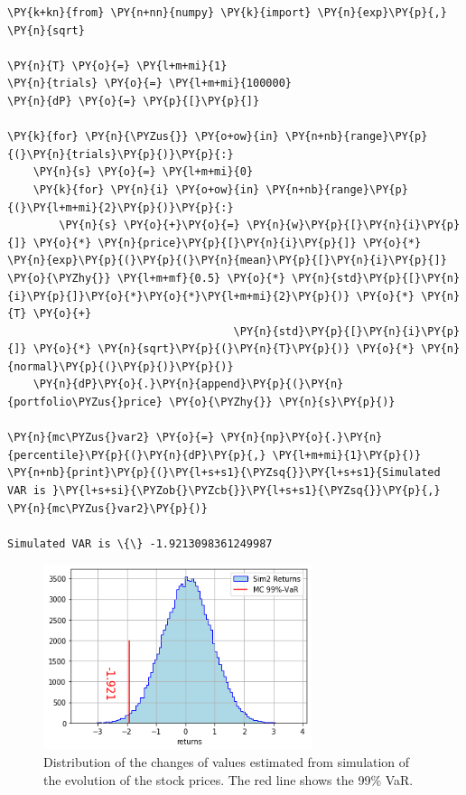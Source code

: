 \begin{tcolorbox}[breakable, size=fbox, boxrule=1pt, pad at break*=1mm,colback=cellbackground, colframe=cellborder]
\begin{Verbatim}[commandchars=\\\{\}]
\PY{k+kn}{from} \PY{n+nn}{numpy} \PY{k}{import} \PY{n}{exp}\PY{p}{,} \PY{n}{sqrt}
		
\PY{n}{T} \PY{o}{=} \PY{l+m+mi}{1}
\PY{n}{trials} \PY{o}{=} \PY{l+m+mi}{100000}
\PY{n}{dP} \PY{o}{=} \PY{p}{[}\PY{p}{]}
		
\PY{k}{for} \PY{n}{\PYZus{}} \PY{o+ow}{in} \PY{n+nb}{range}\PY{p}{(}\PY{n}{trials}\PY{p}{)}\PY{p}{:}
    \PY{n}{s} \PY{o}{=} \PY{l+m+mi}{0}
    \PY{k}{for} \PY{n}{i} \PY{o+ow}{in} \PY{n+nb}{range}\PY{p}{(}\PY{l+m+mi}{2}\PY{p}{)}\PY{p}{:}
        \PY{n}{s} \PY{o}{+}\PY{o}{=} \PY{n}{w}\PY{p}{[}\PY{n}{i}\PY{p}{]} \PY{o}{*} \PY{n}{price}\PY{p}{[}\PY{n}{i}\PY{p}{]} \PY{o}{*} \PY{n}{exp}\PY{p}{(}\PY{p}{(}\PY{n}{mean}\PY{p}{[}\PY{n}{i}\PY{p}{]} \PY{o}{\PYZhy{}} \PY{l+m+mf}{0.5} \PY{o}{*} \PY{n}{std}\PY{p}{[}\PY{n}{i}\PY{p}{]}\PY{o}{*}\PY{o}{*}\PY{l+m+mi}{2}\PY{p}{)} \PY{o}{*} \PY{n}{T} \PY{o}{+} 
                                   \PY{n}{std}\PY{p}{[}\PY{n}{i}\PY{p}{]} \PY{o}{*} \PY{n}{sqrt}\PY{p}{(}\PY{n}{T}\PY{p}{)} \PY{o}{*} \PY{n}{normal}\PY{p}{(}\PY{p}{)}\PY{p}{)}
    \PY{n}{dP}\PY{o}{.}\PY{n}{append}\PY{p}{(}\PY{n}{portfolio\PYZus{}price} \PY{o}{\PYZhy{}} \PY{n}{s}\PY{p}{)}
		
\PY{n}{mc\PYZus{}var2} \PY{o}{=} \PY{n}{np}\PY{o}{.}\PY{n}{percentile}\PY{p}{(}\PY{n}{dP}\PY{p}{,} \PY{l+m+mi}{1}\PY{p}{)}
\PY{n+nb}{print}\PY{p}{(}\PY{l+s+s1}{\PYZsq{}}\PY{l+s+s1}{Simulated VAR is }\PY{l+s+si}{\PYZob{}\PYZcb{}}\PY{l+s+s1}{\PYZsq{}}\PY{p}{,} \PY{n}{mc\PYZus{}var2}\PY{p}{)}

Simulated VAR is \{\} -1.9213098361249987
\end{Verbatim}
\end{tcolorbox}

\begin{figure}[htb]
	\centering
	\includegraphics[width=0.7\textwidth]{figures/Untitled_3_1.png}
	\caption{Distribution of the changes of values estimated from simulation of the evolution of the stock prices. The red line shows the 99\% VaR.}
	\label{fig:mc2_var}
\end{figure}


